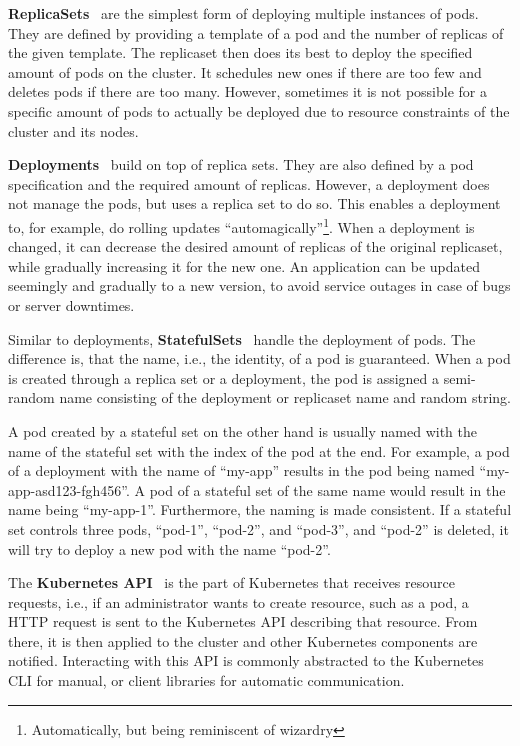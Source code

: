 \textbf{ReplicaSets}~\cite{kubernetes-replicaset} are the simplest form of deploying multiple instances of pods.
They are defined by providing a template of a pod and the number of replicas of the given template.
The replicaset then does its best to deploy the specified amount of pods on the cluster.
It schedules new ones if there are too few and deletes pods if there are too many.
However, sometimes it is not possible for a specific amount of pods to actually be deployed due to resource constraints of the cluster and its nodes.

\textbf{Deployments}~\cite{kubernetes-deployments} build on top of replica sets.
They are also defined by a pod specification and the required amount of replicas.
However, a deployment does not manage the pods, but uses a replica set to do so.
This enables a deployment to, for example, do rolling updates ``automagically''\footnote{Automatically, but being reminiscent of wizardry}.
When a deployment is changed, it can decrease the desired amount of replicas of the original replicaset, while gradually increasing it for the new one.
An application can be updated seemingly and gradually to a new version, to avoid service outages in case of bugs or server downtimes.

Similar to deployments, \textbf{StatefulSets}~\cite{kubernetes-statefulsets} handle the deployment of pods.
The difference is, that the name, i.e., the identity, of a pod is guaranteed.
When a pod is created through a replica set or a deployment, the pod is assigned a semi-random name consisting of the deployment or replicaset name and random string.

A pod created by a stateful set on the other hand is usually named with the name of the stateful set with the index of the pod at the end.
For example, a pod of a deployment with the name of ``my-app'' results in the pod being named ``my-app-asd123-fgh456''.
A pod of a stateful set of the same name would result in the name being ``my-app-1''.
Furthermore, the naming is made consistent.
If a stateful set controls three pods, ``pod-1'', ``pod-2'', and ``pod-3'', and ``pod-2'' is deleted, it will try to deploy a new pod with the name ``pod-2''.

The \textbf{Kubernetes API}~\cite{kubernetes-api} is the part of Kubernetes that receives resource requests, i.e., if an administrator wants to create resource, such as a pod, a HTTP request is sent to the Kubernetes API describing that resource.
From there, it is then applied to the cluster and other Kubernetes components are notified.
Interacting with this API is commonly abstracted to the Kubernetes CLI for manual, or client libraries for automatic communication.

